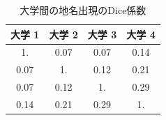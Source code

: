 \begin{table}[h]
\begin{center}
\caption{大学間の地名出現のDice係数} \label{tab:dice}
\begin{tabular}{cccc}
大学 1 & 大学 2 & 大学 3 & 大学 4 \\
\hline
 1.& 0.07& 0.07& 0.14 \\
 0.07& 1.& 0.12& 0.21 \\
 0.07& 0.12& 1.& 0.29 \\
 0.14& 0.21& 0.29& 1. \\
\end{tabular}
\end{center}
\end{table}
